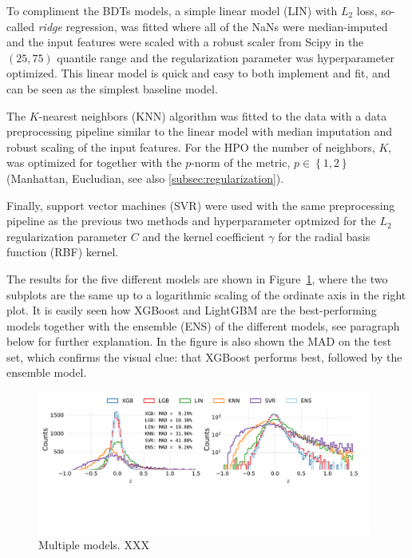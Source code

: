 To compliment the BDTs models, a simple linear model (LIN) with $L_2$ loss, so-called \emph{ridge} regression, was fitted where all of the NaNs were median-imputed and the input features were scaled with a robust scaler from Scipy \autocite{virtanenSciPyFundamentalAlgorithms2019} in the $(25, 75)$ quantile range and the regularization parameter was hyperparameter optimized. This linear model is quick and easy to both implement and fit, and can be seen as the simplest baseline model.

The $K$-nearest neighbors (KNN) algorithm was fitted to the data with a data preprocessing pipeline similar to the linear model with median imputation and robust scaling of the input features. For the HPO the number of neighbors, $K$, was optimized for together with the $p$-norm of the metric, $p \in \left\{ 1, 2\right\}$ (Manhattan, Eucludian, see also \autoref{subsec:regularization}).

Finally, support vector machines (SVR) were used with the same preprocessing pipeline as the previous two methods and hyperparameter optmized for the $L_2$ regularization parameter $C$ and the kernel coefficient $\gamma$ for the radial basis function (RBF) kernel. 

The results for the five different models are shown in Figure~\ref{fig:h:multiple_models}, where the two subplots are the same up to a logarithmic scaling of the ordinate axis in the right plot. It is easily seen how XGBoost and LightGBM are the best-performing models together with the ensemble (ENS) of the different models, see paragraph below for further explanation. In the figure is also shown the MAD on the test set, which confirms the visual clue: that XGBoost performs best, followed by the ensemble model.

\begin{figure}[ht!]
  \centerfloat
  \includegraphics[draft=false, width=0.98\textwidth, trim=10 130 40 10, clip]{figures/housing/Ejerlejlighed_v19_cut_all_Ncols_all_all_models.pdf}
  \caption[Multiple Models XXX]
          {Multiple models. XXX
          } 
  \label{fig:h:multiple_models}
\end{figure}

